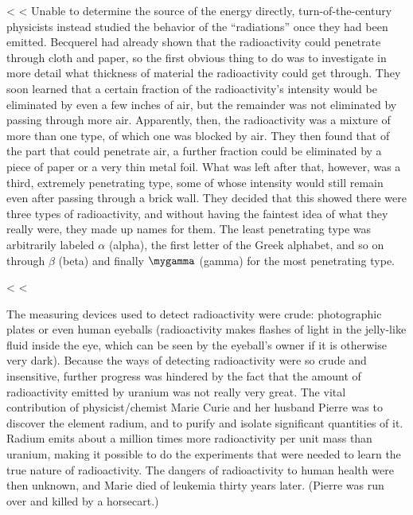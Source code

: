     <%
    <%
        Unable to determine the source of the energy directly,
        turn-of-the-century physicists instead studied the behavior of the
        ``radiations'' once they had been emitted.
         Becquerel had already shown that the
        radioactivity could penetrate through cloth and paper, so
        the first obvious thing to do was to investigate in more
        detail what thickness of material the radioactivity could
        get through. They soon learned that a certain fraction of
        the radioactivity's intensity would be eliminated by even a
        few inches of air, but the remainder was not eliminated by
        passing through more air. Apparently, then, the radioactivity
        was a mixture of more than one type, of which one was
        blocked by air. They then found that of the part that could
        penetrate air, a further fraction could be eliminated by a
        piece of paper or a very thin metal foil. What was left
        after that, however, was a third, extremely penetrating
        type, some of whose intensity would still remain even after
        passing through a brick wall. They decided that this showed
        there were three types of radioactivity, and without having
        the faintest idea of what they really were, they made up
        names for them. The least penetrating type was arbitrarily
        labeled $\alpha$ (alpha), the first letter of the Greek alphabet,
        and so on through $\beta$ (beta) and finally $\mygamma$
        (gamma) for the most penetrating type.

    <%
    <%

        The measuring devices used to detect radioactivity were
        crude: photographic plates or even human eyeballs (radioactivity
        makes flashes of light in the jelly-like fluid inside
        the eye, which can be seen by the eyeball's owner if it is
        otherwise very dark). Because the ways of detecting
        radioactivity were so crude and insensitive, further
        progress was hindered by the fact that the amount of
        radioactivity emitted by uranium was not really very great.
        The vital contribution of physicist/chemist Marie Curie and
        her husband Pierre was to discover the element radium, and
        to purify and isolate significant quantities of it. Radium
        emits about a million times more radioactivity per unit mass
        than uranium, making it possible to do the experiments that
        were needed to learn the true nature of radioactivity. The
        dangers of radioactivity to human health were then unknown,
        and Marie died of leukemia thirty years later. (Pierre was
        run over and killed by a horsecart.)

